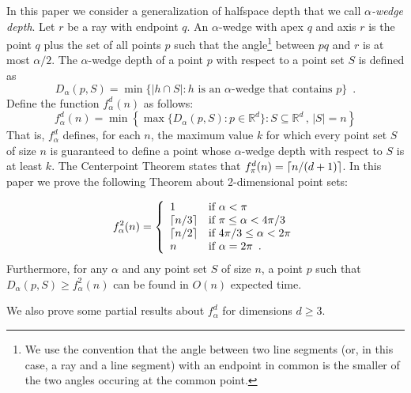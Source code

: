 \documentclass[lotsofwhite]{patmorin}
\begin{document}
In this paper we consider a generalization of halfspace depth that we
call \emph{$\alpha$-wedge depth}. Let $r$ be a ray with endpoint $q$.
An $\alpha$-wedge with apex $q$ and axis $r$ is the point $q$ plus 
the set of all points
$p$ such that the angle\footnote{We use the convention that the angle
between two line segments (or, in this case, a ray and a line segment)
with an endpoint in common is the smaller of the two angles occuring
at the common point.} between $pq$ and $r$ is at most $\alpha/2$.  The
$\alpha$-wedge depth of a point $p$ with respect to a point set $S$ is
defined as
\[
D_\alpha(p,S) =
   \min\{|h\cap S| : \mbox{$h$ is an $\alpha$-wedge that contains $p$} \} 
   \enspace .
\]
Define the function $f^d_\alpha(n)$ as follows:
\[
   f^d_\alpha(n) = \min\left\{\max\{D_\alpha(p,S):p\in
\mathbb{R}^d\}: S\subseteq\mathbb{R}^d\, ,\, |S|=n\right\}
\]
That is, $f^d_\alpha$ defines, for each $n$, the maximum value $k$ for
which every point set $S$ of size $n$ is guaranteed to define a point
whose $\alpha$-wedge depth with respect to $S$ is at least $k$.  The
Centerpoint Theorem states that $f^d_\pi(n) = \left\lceil n/(d+1) \right\rceil$.  In this paper
we prove the following Theorem about 2-dimensional point sets:

\begin{thm}
\[
   f^2_\alpha(n) = \left\{\begin{array}{ll}
                        1 & \mbox{if $\alpha < \pi$} \\
                        \left\lceil n/3 \right\rceil & \mbox{if $\pi\le \alpha < 4\pi/3$} \\
                        \left\lceil n/2 \right\rceil & \mbox{if $4\pi/3\le \alpha < 2\pi$} \\
                        n & \mbox{if $\alpha = 2\pi$\enspace .} 
                       \end{array}\right.
\]
Furthermore, for any $\alpha$ and any point set $S$ of size $n$, a
point $p$ such that $D_\alpha(p,S) \ge
f^2_\alpha(n)$ can be found in $O(n)$ expected time.
\end{thm}

We also prove some partial results about $f^d_\alpha$ for dimensions
$d\ge 3$.
\end{document}
